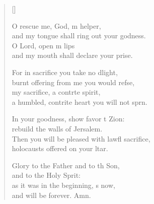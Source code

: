 \begin{verse}[\versewidth]
\begin{patverse}
O rescue me, God, m helper,\Med\\
and my tongue shall ring out your godness.\\
O Lord, open m lips\Med\\
and my mouth shall declare your prise.

For in sacrifice you take no dlight,\Med\\
burnt offering from me you would refse,\\
my sacrifice, a contr\pointup{\i}te spirit,\Med\\
a humbled, contrite heart you will not sprn.

In your goodness, show favor t Zion:\Med\\
rebuild the walls of Jersalem.\\
Then you will be pleased with lawfl sacrifice,\Med\\
holocausts offered on your ltar.

Glory to the Father and to th Son,\Med\\
and to the Holy Sp\pointup{\i}rit:\\
as it was in the beginning, \pointup{\i}s now,\Med\\
and will be forever. Amn.
  \end{patverse}
\end{verse}
